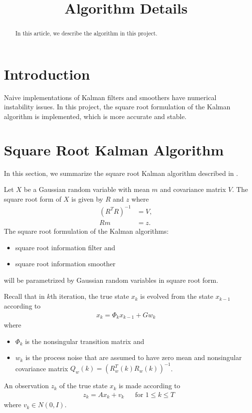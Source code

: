 \documentclass[microtype]{gtpart}     %
\title{Algorithm Details}
\author{}
\theoremstyle{definition}
\begin{document}
\begin{abstract}    %

In this article, we describe the algorithm in this project.

\end{abstract}

\maketitle


\section{Introduction}

Naive implementations of Kalman filters and smoothers have numerical instability issues.
In this project, the square root formulation of the Kalman algorithm is implemented, which is more accurate and stable. 

\section{Square Root Kalman Algorithm}

In this section, we summarize the square root Kalman algorithm described in \cite{bierman2006factorization}.

Let $X$ be a Gaussian random variable with mean $m$ and covariance matrix $V$.
The square root form of $X$ is given by $R$ and $z$ where
\begin{align*}
 (R^TR)^{-1} &= V, \\
 Rm &= z.
\end{align*}
The square root formulation of the Kalman algorithms:
\begin{itemize}
	\item square root information filter and
	\item square root information smoother
\end{itemize}
will be parametrized by Gaussian random variables in square root form.

Recall that in $k$th iteration, the true state $x_k$ is evolved from the state $x_{k-1}$ according to
\begin{align}
x_k = \Phi_k x_{k-1} + Gw_k \label{eq:predict}
\end{align}
where
\begin{itemize}
	\item $\Phi_k$ is the nonsingular transition matrix and
	\item $w_k$ is the process noise that are assumed to have zero mean and nonsingular covariance matrix 
	$Q_w(k)=(R^T_w(k)R_w(k))^{-1}$.
\end{itemize}
An observation $z_k$ of the true state $x_k$ is made according to
\begin{align*}
	&z_k = A x_k + v_k & &\text{for } 1\leq k \leq T
\end{align*}
where $v_k \in N(0, I)$.
\end{document}
